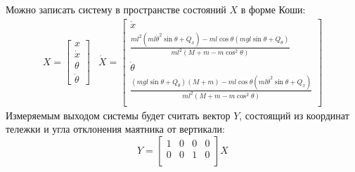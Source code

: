 Можно записать систему в пространстве состояний $X$ в форме Коши: 
\begin{equation}
    \begin{array}{cc}
        X = \begin{bmatrix} 
            x \\
            \dot{x} \\
            \theta \\
            \dot{\theta}
    \end{bmatrix} & 
    \dot{X} = \begin{bmatrix}
        \dot{x} \\
        \frac{ml^2(ml\dot{\theta}^2\sin\theta + Q_x) - ml\cos\theta(mgl\sin\theta + Q_{\theta})}{ml^2(M + m - m\cos^2\theta)} \\ 
        \dot{\theta} \\
        \frac{(mgl\sin\theta + Q_{\theta})(M + m) - ml\cos\theta(ml\dot{\theta}^2\sin\theta + Q_x)}{ml^2(M + m - m\cos^2\theta)} \\ 
    \end{bmatrix}
    \end{array}
\end{equation}
Измеряемым выходом системы будет считать вектор $Y$, состоящий из координат тележки и угла отклонения маятника от вертикали:
\begin{equation}
    Y = \begin{bmatrix}
        1 & 0 & 0 & 0 \\
        0 & 0 & 1 & 0 \\ 
    \end{bmatrix} X
\end{equation}

